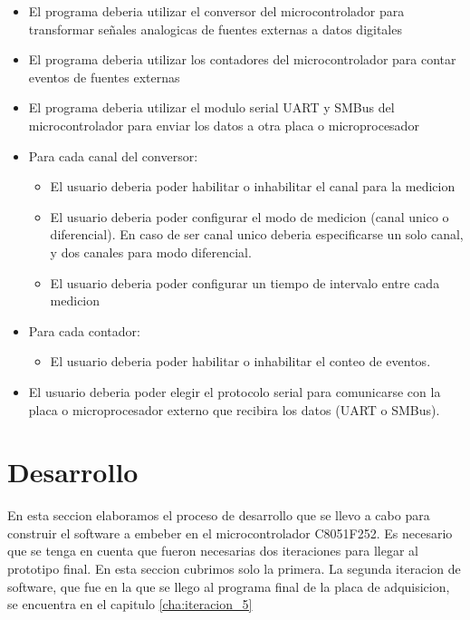 \begin{itemize}
\item El programa deberia utilizar el conversor del microcontrolador para transformar señales analogicas de fuentes externas a datos digitales
\item El programa deberia utilizar los contadores del microcontrolador para contar eventos de fuentes externas
\item El programa deberia utilizar el modulo serial UART y SMBus del microcontrolador para enviar los datos a otra placa o microprocesador
\item Para cada canal del conversor:
\begin{itemize}
\item El usuario deberia poder habilitar o inhabilitar el canal para la medicion
\item El usuario deberia poder configurar el modo de medicion (canal unico o diferencial). En caso de ser canal unico deberia especificarse un solo canal, y dos canales para modo diferencial.
\item El usuario deberia poder configurar un tiempo de intervalo entre cada medicion
\end{itemize}
\item Para cada contador:
\begin{itemize}
\item El usuario deberia poder habilitar o inhabilitar el conteo de eventos.
\end{itemize}
\item El usuario deberia poder elegir el protocolo serial para comunicarse con la placa o microprocesador externo que recibira los datos (UART o SMBus).

\end{itemize}



\section{Desarrollo} %
\label{sec:desarrollo}

En esta seccion elaboramos el proceso de desarrollo que se llevo a cabo para construir el software a embeber en el microcontrolador C8051F252\cite{c8051f352}. Es necesario que se tenga en cuenta que fueron necesarias dos iteraciones para llegar al prototipo final. En esta seccion cubrimos solo la primera. La segunda iteracion de software, que fue en la que se llego al programa final de la placa de adquisicion, se encuentra en el capitulo \ref{cha:iteracion_5}

